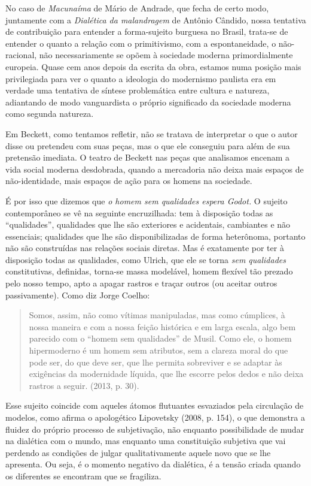 No caso de \emph{Macunaíma} de Mário de Andrade, que fecha de certo
modo, juntamente com a \emph{Dialética da malandragem} de Antônio
Cândido, nossa tentativa de contribuição para entender a forma-sujeito
burguesa no Brasil, trata-se de entender o quanto a relação com o
primitivismo, com a espontaneidade, o não-racional, não necessariamente
se opõem à sociedade moderna primordialmente europeia. Quase cem anos
depois da escrita da obra, estamos numa posição mais privilegiada para
ver o quanto a ideologia do modernismo paulista era em verdade uma
tentativa de síntese problemática entre cultura e natureza, adiantando
de modo vanguardista o próprio significado da sociedade moderna como
segunda natureza.

Em Beckett, como tentamos refletir, não se tratava de interpretar o que
o autor disse ou pretendeu com suas peças, mas o que ele conseguiu para
além de sua pretensão imediata. O teatro de Beckett nas peças que
analisamos encenam a vida social moderna desdobrada, quando a mercadoria
não deixa mais espaços de não-identidade, mais espaços de ação para os
homens na sociedade.

É por isso que dizemos que \emph{o homem sem qualidades espera Godot.} O
sujeito contemporâneo se vê na seguinte encruzilhada: tem à disposição
todas as ``qualidades'', qualidades que lhe são exteriores e acidentais,
cambiantes e não essenciais; qualidades que lhe são disponibilizadas de
forma heterônoma, portanto não são construídas nas relações sociais
diretas. Mas é exatamente por ter à disposição todas as qualidades, como
Ulrich, que ele se torna \emph{sem qualidades} constitutivas, definidas,
torna-se massa modelável, homem flexível tão prezado pelo nosso tempo,
apto a apagar rastros e traçar outros (ou aceitar outros passivamente).
Como diz Jorge Coelho:

\begin{quote}
Somos, assim, não como vítimas manipuladas, mas como cúmplices, à nossa
maneira e com a nossa feição histórica e em larga escala, algo bem
parecido com o ``homem sem qualidades'' de Musil. Como ele, o homem
hipermoderno é um homem sem atributos, sem a clareza moral do que pode
ser, do que deve ser, que lhe permita sobreviver e se adaptar às
exigências da modernidade líquida, que lhe escorre pelos dedos e não
deixa rastros a seguir. (2013, p. 30).
\end{quote}

Esse sujeito coincide com aqueles átomos flutuantes esvaziados pela
circulação de modelos, como afirma o apologético Lipovetsky (2008, p.
154), o que demonstra a fluidez do próprio processo de subjetivação, não
enquanto possibilidade de mudar na dialética com o mundo, mas enquanto
uma constituição subjetiva que vai perdendo as condições de julgar
qualitativamente aquele novo que se lhe apresenta. Ou seja, é o momento
negativo da dialética, é a tensão criada quando os diferentes se
encontram que se fragiliza.

